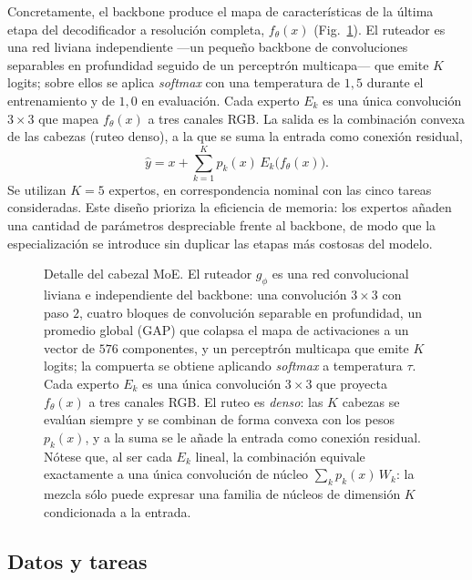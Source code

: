 \documentclass[aps,prl,twocolumn,groupedaddress]{revtex4-2}
\begin{document}
Concretamente, el backbone produce el mapa de características de la última etapa del decodificador a resolución completa, $f_\theta(x)$ (Fig.~\ref{fig:moehead}). El ruteador es una red liviana independiente ---un pequeño backbone de convoluciones separables en profundidad seguido de un perceptrón multicapa--- que emite $K$ logits; sobre ellos se aplica \textit{softmax} con una temperatura de $1{,}5$ durante el entrenamiento y de $1{,}0$ en evaluación. Cada experto $E_k$ es una única convolución $3\times 3$ que mapea $f_\theta(x)$ a tres canales RGB. La salida es la combinación convexa de las cabezas (ruteo denso), a la que se suma la entrada como conexión residual,
\begin{equation}
\hat{y} = x + \sum_{k=1}^{K} p_k(x)\, E_k\big(f_\theta(x)\big).
\end{equation}
Se utilizan $K=5$ expertos, en correspondencia nominal con las cinco tareas consideradas. Este diseño prioriza la eficiencia de memoria: los expertos añaden una cantidad de parámetros despreciable frente al backbone, de modo que la especialización se introduce sin duplicar las etapas más costosas del modelo.

\begin{figure}[t]
\centering

\caption{\label{fig:moehead}Detalle del cabezal MoE. El ruteador $g_\phi$ es una red
convolucional liviana e independiente del backbone: una convolución $3\times 3$ con paso
$2$, cuatro bloques de convolución separable en profundidad, un promedio global (GAP)
que colapsa el mapa de activaciones a un vector de $576$ componentes, y un perceptrón
multicapa que emite $K$ logits; la compuerta se obtiene aplicando \textit{softmax} a
temperatura $\tau$. Cada experto $E_k$ es una única convolución $3\times 3$ que proyecta
$f_\theta(x)$ a tres canales RGB. El ruteo es \emph{denso}: las $K$ cabezas se evalúan
siempre y se combinan de forma convexa con los pesos $p_k(x)$, y a la suma se le añade
la entrada como conexión residual. Nótese que, al ser cada $E_k$ lineal, la combinación
equivale exactamente a una única convolución de núcleo $\sum_k p_k(x)\,W_k$: la mezcla
sólo puede expresar una familia de núcleos de dimensión $K$ condicionada a la entrada.}
\end{figure}

\subsection{Datos y tareas}
\end{document}
